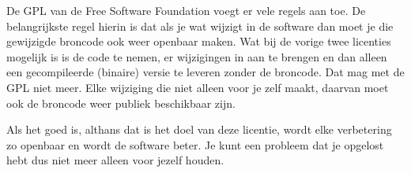 De GPL van de Free Software Foundation voegt er vele regels aan toe. De belangrijkste regel hierin is dat als je wat
wijzigt in de software dan moet je die gewijzigde broncode ook weer openbaar maken. Wat bij de vorige twee licenties
mogelijk is is de code te nemen, er wijzigingen in aan te brengen en dan alleen een gecompileerde (binaire) versie te
leveren zonder de broncode. Dat mag met de GPL niet meer. Elke wijziging die niet alleen voor je zelf maakt, daarvan
moet ook de broncode weer publiek beschikbaar zijn.\par

Als het goed is, althans dat is het doel van deze licentie, wordt elke verbetering zo openbaar en wordt de software
beter. Je kunt een probleem dat je opgelost hebt dus niet meer alleen voor jezelf houden.
